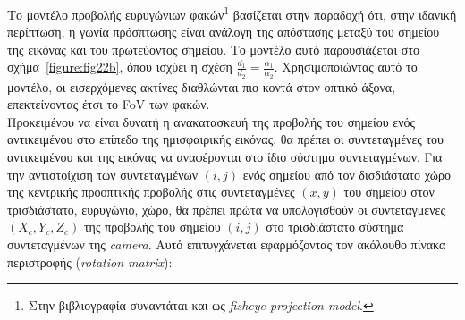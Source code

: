 \indent
Το μοντέλο προβολής ευρυγώνιων φακών\footnote{\small Στην βιβλιογραφία συναντάται και ως \textsl{fisheye projection model}.} βασίζεται στην παραδοχή ότι, στην ιδανική περίπτωση, η γωνία πρόσπτωσης είναι ανάλογη της απόστασης μεταξύ του σημείου της εικόνας και του πρωτεύοντος σημείου. Το μοντέλο αυτό παρουσιάζεται στο σχήμα~\ref{figure:fig22b}, όπου ισχύει η σχέση \(\frac{d_{1}}{d_{2}} = \frac{\alpha_{1}}{\alpha_{2}}\). Χρησιμοποιώντας αυτό το μοντέλο, οι εισερχόμενες ακτίνες διαθλώνται πιο κοντά στον οπτικό άξονα, επεκτείνοντας έτσι το \ac{FoV} των φακών.\\
\indent
Προκειμένου να είναι δυνατή η ανακατασκευή της προβολής του σημείου ενός αντικειμένου στο επίπεδο της ημισφαιρικής εικόνας, θα πρέπει οι συντεταγμένες του αντικειμένου και της εικόνας να αναφέρονται στο ίδιο σύστημα συντεταγμένων. Για την αντιστοίχιση των συντεταγμένων \((i, j)\) ενός σημείου από τον δισδιάστατο χώρο της κεντρικής προοπτικής προβολής στις συντεταγμένες \((x, y)\) του σημείου στον τρισδιάστατο, ευρυγώνιο, χώρο, θα πρέπει πρώτα να υπολογισθούν οι συντεταγμένες \((X_{c}, Y_{c}, Z_{c})\) της προβολής του σημείου \((i, j)\) στο τρισδιάστατο σύστημα συντεταγμένων της \textsl{camera}. Αυτό επιτυγχάνεται εφαρμόζοντας τον ακόλουθο πίνακα περιστροφής (\textsl{rotation matrix}):


